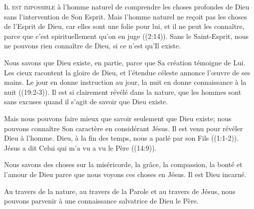\dvrule






\lettrine{I}{l est impossible} à l'homme naturel de comprendre
 les choses profondes de Dieu sans l'intervention de Son Esprit.
 \Og Mais l'homme naturel ne re\c{c}oit pas les choses de l'Esprit de Dieu,
 car elles sont une folie pour lui, et il ne peut les connaître,
 parce que c'est spirituellement qu'on en juge \Fg{}
 ((2:14)).
 Sans le Saint-Esprit, nous ne pouvons rien connaître de Dieu,
 si ce n'est qu'Il existe.

Nous savons que Dieu existe, en partie, parce que Sa création
 témoigne de Lui. \Og Les cieux racontent la gloire de Dieu,
 et l'étendue céleste annonce l'\oe{}uvre de ses mains.
 Le jour en donne instruction au jour, la nuit en donne connaissance
 à la nuit \Fg{} ((19:2-3)).
 Il est si clairement révélé dans la nature, que les hommes sont
 sans excuses quand il s'agit de savoir que Dieu existe.

Mais nous pouvons faire mieux que savoir seulement que Dieu existe;
 nous pouvons connaître Son caractère en considérant Jésus.
 Il est venu pour révéler Dieu à l'homme.
 \Og Dieu, à la fin des temps, nous a parlé par son Fils \Fg{}
 ((1:1-2)).
 Jésus a dit\frcolon {}
 \Og Celui qui m'a vu a vu le Père \Fg{} ((14:9)).

Nous savons des choses sur la miséricorde, la grâce, la compassion,
 la bonté et l'amour de Dieu parce que nous voyons ces choses en Jésus.
 Il est Dieu incarné.

Au travers de la nature, au travers de la Parole et au travers de Jésus,
 nous pouvons parvenir à une connaissance salvatrice de Dieu le Père.


